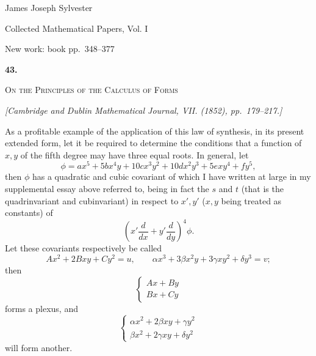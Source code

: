 \documentclass[11pt]{article}
\newcommand{\paperhead}[3]{%
  \clearpage
  \begin{center}
  {\Large\bfseries #1.}\par\vspace{0.85em}
  {\large\scshape #2}\par\vspace{0.6em}
  {\itshape [#3]}\par
  \end{center}\vspace{0.4em}}
\newcommand{\sourcepage}[1]{\marginpar{\scriptsize p.~#1}}
\begin{document}
\begin{center}
{\Large James Joseph Sylvester}\par\vspace{0.25em}
{\large Collected Mathematical Papers, Vol. I}\par\vspace{0.25em}
{\normalsize New work: book pp.~348--377}\par
\end{center}
\thispagestyle{empty}
\vspace{0.75em}

\paperhead{43}{On the Principles of the Calculus of Forms}{Cambridge and Dublin Mathematical Journal, VII. (1852), pp.~179--217.}

\sourcepage{348}
As a profitable example of the application of this law of synthesis, in its present extended form, let it be required to determine the conditions that a function of $x,y$ of the fifth degree may have three equal roots. In general, let
\[
\phi=ax^5+5bx^4y+10cx^3y^2+10dx^2y^3+5exy^4+fy^5,
\]
then $\phi$ has a quadratic and cubic covariant of which I have written at large in my supplemental essay above referred to, being in fact the $s$ and $t$ (that is the quadrinvariant and cubinvariant) in respect to $x',y'$ ($x,y$ being treated as constants) of
\[
\left(x'\frac{d}{dx}+y'\frac{d}{dy}\right)^4\phi.
\]
Let these covariants respectively be called
\[
Ax^2+2Bxy+Cy^2=u,
\qquad
\alpha x^3+3\beta x^2y+3\gamma xy^2+\delta y^3=v;
\]
then
\[
\left\{\begin{matrix} Ax+By\\ Bx+Cy\end{matrix}\right.
\]
forms a plexus, and
\[
\left\{\begin{matrix}
\alpha x^2+2\beta xy+\gamma y^2\\
\beta x^2+2\gamma xy+\delta y^2
\end{matrix}\right.
\]
will form another.
\end{document}
